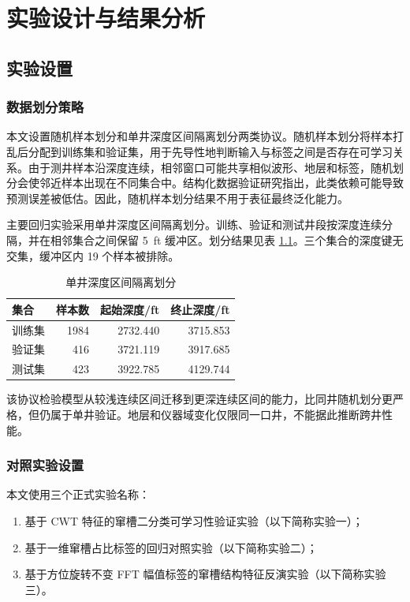 \chapter{实验设计与结果分析}

\section{实验设置}

\subsection{数据划分策略}

本文设置随机样本划分和单井深度区间隔离划分两类协议。随机样本划分将样本打乱后分配到训练集和验证集，用于先导性地判断输入与标签之间是否存在可学习关系。由于测井样本沿深度连续，相邻窗口可能共享相似波形、地层和标签，随机划分会使邻近样本出现在不同集合中。结构化数据验证研究指出，此类依赖可能导致预测误差被低估\cite{Roberts2017CrossValidation,Valavi2019BlockCV,Ploton2020SpatialValidation}。因此，随机样本划分结果不用于表征最终泛化能力。

主要回归实验采用单井深度区间隔离划分。训练、验证和测试井段按深度连续分隔，并在相邻集合之间保留 5~ft 缓冲区。划分结果见表 \ref{tab:depth-split}。三个集合的深度键无交集，缓冲区内 19 个样本被排除。

\begin{table}[htbp]
  \centering
  \caption{单井深度区间隔离划分}
  \label{tab:depth-split}
  \begin{tabular}{lrrr}
    \toprule
    集合 & 样本数 & 起始深度/ft & 终止深度/ft \\
    \midrule
    训练集 & 1984 & 2732.440 & 3715.853 \\
    验证集 & 416 & 3721.119 & 3917.685 \\
    测试集 & 423 & 3922.785 & 4129.744 \\
    \bottomrule
  \end{tabular}
\end{table}

该协议检验模型从较浅连续区间迁移到更深连续区间的能力，比同井随机划分更严格，但仍属于单井验证。地层和仪器域变化仅限同一口井，不能据此推断跨井性能。

\subsection{对照实验设置}

本文使用三个正式实验名称：

\begin{enumerate}
  \item 基于 CWT 特征的窜槽二分类可学习性验证实验（以下简称实验一）；
  \item 基于一维窜槽占比标签的回归对照实验（以下简称实验二）；
  \item 基于方位旋转不变 FFT 幅值标签的窜槽结构特征反演实验（以下简称实验三）。
\end{enumerate}

